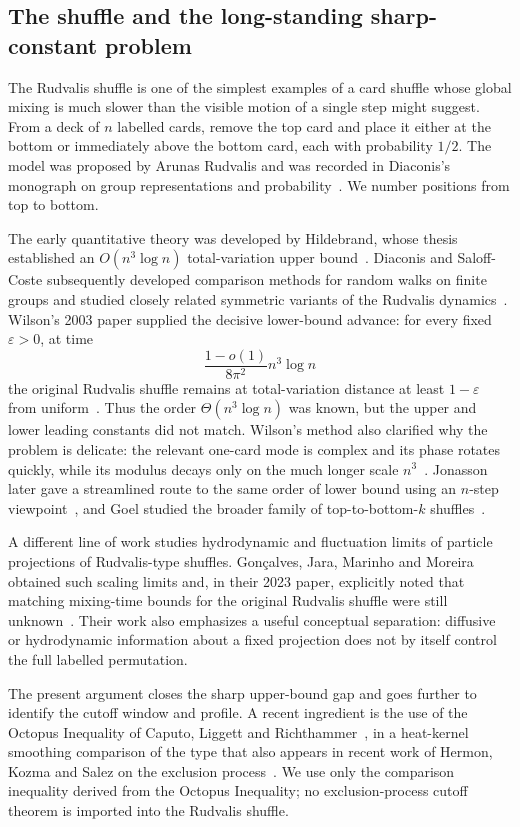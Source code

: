 \documentclass[11pt]{article}
\theoremstyle{remark}
\begin{document}
\subsection{The shuffle and the long-standing sharp-constant problem}
The Rudvalis shuffle is one of the simplest examples of a card shuffle whose global mixing is much slower than the visible motion of a single step might suggest.  From a deck of $n$ labelled cards, remove the top card and place it either at the bottom or immediately above the bottom card, each with probability $1/2$.  The model was proposed by Arunas Rudvalis and was recorded in Diaconis's monograph on group representations and probability~\cite{Diaconis1988}.  We number positions from top to bottom.

The early quantitative theory was developed by Hildebrand, whose thesis established an $O(n^3\log n)$ total-variation upper bound~\cite{Hildebrand1990}.  Diaconis and Saloff-Coste subsequently developed comparison methods for random walks on finite groups and studied closely related symmetric variants of the Rudvalis dynamics~\cite{DSC1993,DSC1995}.  Wilson's 2003 paper supplied the decisive lower-bound advance: for every fixed $\varepsilon>0$, at time
\[
  \frac{1-o(1)}{8\pi^2}n^3\log n
\]
the original Rudvalis shuffle remains at total-variation distance at least $1-\varepsilon$ from uniform~\cite[Theorem~1]{Wilson2003}.  Thus the order $\Theta(n^3\log n)$ was known, but the upper and lower leading constants did not match.  Wilson's method also clarified why the problem is delicate: the relevant one-card mode is complex and its phase rotates quickly, while its modulus decays only on the much longer scale $n^3$~\cite{Wilson2003}.  Jonasson later gave a streamlined route to the same order of lower bound using an $n$-step viewpoint~\cite{Jonasson2006}, and Goel studied the broader family of top-to-bottom-$k$ shuffles~\cite{Goel2006}.

A different line of work studies hydrodynamic and fluctuation limits of particle projections of Rudvalis-type shuffles.  Gon\c{c}alves, Jara, Marinho and Moreira obtained such scaling limits and, in their 2023 paper, explicitly noted that matching mixing-time bounds for the original Rudvalis shuffle were still unknown~\cite{GoncalvesEtAl2023}.  Their work also emphasizes a useful conceptual separation: diffusive or hydrodynamic information about a fixed projection does not by itself control the full labelled permutation.

The present argument closes the sharp upper-bound gap and goes further to identify the cutoff window and profile.  A recent ingredient is the use of the Octopus Inequality of Caputo, Liggett and Richthammer~\cite{CLR}, in a heat-kernel smoothing comparison of the type that also appears in recent work of Hermon, Kozma and Salez on the exclusion process~\cite{HKS}.  We use only the comparison inequality derived from the Octopus Inequality; no exclusion-process cutoff theorem is imported into the Rudvalis shuffle.
\end{document}
